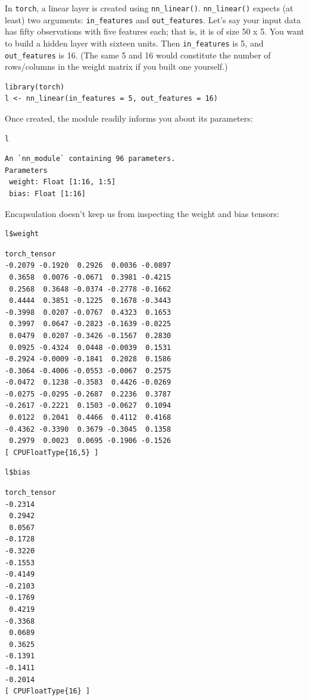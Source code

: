 \documentclass[
  letterpaper,
]{krantz}
\begin{document}
In \texttt{torch}, a linear layer is created using
\texttt{nn\_linear()}. \texttt{nn\_linear()} expects (at least) two
arguments: \texttt{in\_features} and \texttt{out\_features}. Let's say
your input data has fifty observations with five features each; that is,
it is of size 50 x 5. You want to build a hidden layer with sixteen
units. Then \texttt{in\_features} is 5, and \texttt{out\_features} is
16. (The same 5 and 16 would constitute the number of rows/columns in
the weight matrix if you built one yourself.)

\begin{verbatim}
library(torch)
l <- nn_linear(in_features = 5, out_features = 16)
\end{verbatim}

Once created, the module readily informs you about its parameters:

\begin{verbatim}
l
\end{verbatim}

\begin{verbatim}
An `nn_module` containing 96 parameters.
Parameters
 weight: Float [1:16, 1:5]
 bias: Float [1:16]
\end{verbatim}

Encapsulation doesn't keep us from inspecting the weight and bias
tensors:

\begin{verbatim}
l$weight
\end{verbatim}

\begin{verbatim}
torch_tensor
-0.2079 -0.1920  0.2926  0.0036 -0.0897
 0.3658  0.0076 -0.0671  0.3981 -0.4215
 0.2568  0.3648 -0.0374 -0.2778 -0.1662
 0.4444  0.3851 -0.1225  0.1678 -0.3443
-0.3998  0.0207 -0.0767  0.4323  0.1653
 0.3997  0.0647 -0.2823 -0.1639 -0.0225
 0.0479  0.0207 -0.3426 -0.1567  0.2830
 0.0925 -0.4324  0.0448 -0.0039  0.1531
-0.2924 -0.0009 -0.1841  0.2028  0.1586
-0.3064 -0.4006 -0.0553 -0.0067  0.2575
-0.0472  0.1238 -0.3583  0.4426 -0.0269
-0.0275 -0.0295 -0.2687  0.2236  0.3787
-0.2617 -0.2221  0.1503 -0.0627  0.1094
 0.0122  0.2041  0.4466  0.4112  0.4168
-0.4362 -0.3390  0.3679 -0.3045  0.1358
 0.2979  0.0023  0.0695 -0.1906 -0.1526
[ CPUFloatType{16,5} ]
\end{verbatim}

\begin{verbatim}
l$bias
\end{verbatim}

\begin{verbatim}
torch_tensor
-0.2314
 0.2942
 0.0567
-0.1728
-0.3220
-0.1553
-0.4149
-0.2103
-0.1769
 0.4219
-0.3368
 0.0689
 0.3625
-0.1391
-0.1411
-0.2014
[ CPUFloatType{16} ]
\end{verbatim}
\end{document}
